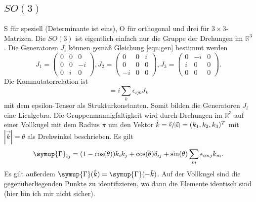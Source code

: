 \documentclass[
  captions=tableheading,  %
  titlepage=firstiscover, %
]{scrartcl}
\begin{document}
\subsection{\texorpdfstring{$SO(3)$}{PDFstring}}
S für speziell (Determinante ist eins), O für orthogonal und drei für $3 \times 3$-Matrizen.
Die $SO(3)$ ist eigentlich einfach nur  die Gruppe der Drehungen im $\mathbb{R}^3$.
Die Generatoren $J_i$ können gemäß Gleichung \eqref{eqn:gen} bestimmt werden
\begin{equation*}
  J_1 = 
  \begin{pmatrix}
    0 & 0 & 0   \\
    0 & 0 & -i  \\
    0 & i & 0 
  \end{pmatrix}, 
  J_2 = 
  \begin{pmatrix}
    0 & 0   & i \\
    0 & 0   & 0 \\
    -i & 0  & 0 
  \end{pmatrix},
  J_3= 
  \begin{pmatrix}
    0 & -i  & 0 \\
    i & 0   & 0 \\
    0 & 0   & 0 
  \end{pmatrix}.
\end{equation*}
Die Kommutatorrelation ist 
\begin{equation*}
  [J_i, J_j] = i \sum_k \epsilon_{ijk} J_k 
\end{equation*}
mit dem epsilon-Tensor als Strukturkonstanten.
Somit bilden die Generatoren $J_i$ eine Liealgebra.
Die Gruppenmannigfaltigkeit wird durch  Drehungen im $\mathbb{R}^3$ auf einer Vollkugel mit dem Radius $\pi$ 
um den Vektor $\hat{k} = \sfrac{\vec{k}}{|\vec{k}|} = (k_1, k_2, k_3)^T$ mit $|\vec{k}| = \theta$ als
Drehwinkel beschrieben.
Es gilt 
\begin{equation*}
  \symup{\Gamma}_{ij} = (1-\cos(\theta)) k_i k_j + \cos(\theta) \delta_{ij} + \sin(\theta) \sum_m \epsilon_{imj}k_m.
\end{equation*}
Es gilt außerdem $\symup{\Gamma}(\hat{k}) = \symup{\Gamma}(-\hat{k})$.
Auf der Vollkugel sind die gegenüberliegenden Punkte zu identifizieren,
wo dann die Elemente identisch sind ({\color{red}hier bin ich mir nicht sicher}).
\end{document}
